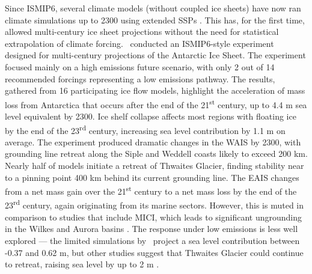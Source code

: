 Since ISMIP6, several climate models (without coupled ice sheets) have now ran climate simulations up to 2300 using extended SSPs \citep{meinshausenSharedSocioeconomicPathway2020}. This has, for the first time, allowed multi-century ice sheet projections without the need for statistical extrapolation of climate forcing.~\cite{seroussiEvolutionAntarcticIce2024} conducted an ISMIP6-style experiment designed for multi-century projections of the Antarctic Ice Sheet. The experiment focused mainly on a high emissions future scenario, with only 2 out of 14 recommended forcings representing a low emissions pathway. The results, gathered from 16 participating ice flow models, highlight the acceleration of mass loss from Antarctica that occurs after the end of the 21\textsuperscript{st} century, up to 4.4 m sea level equivalent by 2300. Ice shelf collapse affects most regions with floating ice by the end of the 23\textsuperscript{rd} century, increasing sea level contribution by 1.1 m on average. The experiment produced dramatic changes in the WAIS by 2300, with grounding line retreat along the Siple and Weddell coasts likely to exceed 200 km. Nearly half of models initiate a retreat of Thwaites Glacier, finding stability near to a pinning point 400 km behind its current grounding line. The EAIS changes from a net mass gain over the 21\textsuperscript{st} century to a net mass loss by the end of the 23\textsuperscript{rd} century, again originating from its marine sectors. However, this is muted in comparison to studies that include MICI, which leads to significant ungrounding in the Wilkes and Aurora basins \citep{decontoParisClimateAgreement2021,gomezInfluenceRealistic3D2024}. The response under low emissions is less well explored --- the limited simulations by~\cite{seroussiEvolutionAntarcticIce2024} project a sea level contribution between -0.37 and 0.62 m, but other studies suggest that Thwaites Glacier could continue to retreat, raising sea level by up to 2 m \citep{kloseLongtermSealevelCommitment2024,coulonDisentanglingDriversFuture2024,coulonShorttermUncertaintiesLongterm2025}.

